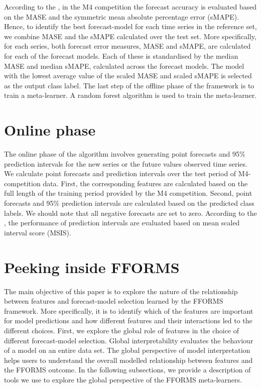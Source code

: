 \documentclass[11pt,a4paper,]{article}
\begin{document}
According to the \textcite{M4compguide}, in the M4 competition the forecast accuracy is evaluated based on the MASE and the symmetric mean absolute percentage error (sMAPE). Hence, to identify the best forecast-model for each time series in the reference set, we combine MASE and the sMAPE calculated over the test set. More specifically, for each series, both forecast error measures, MASE and sMAPE, are calculated for each of the forecast models. Each of these is standardised by the median MASE and median sMAPE, calculated across the forecast models. The model with the lowest average value of the scaled MASE and scaled sMAPE is selected as the output class label. The last step of the offline phase of the framework is to train a meta-learner. A random forest algorithm is used to train the meta-learner.

\hypertarget{online}{%
\section{Online phase}\label{online}}

The online phase of the algorithm involves generating point forecasts and 95\% prediction intervals for the new series or the future values observed time series. We calculate point forecasts and prediction intervals over the test period of M4-competition data. First, the corresponding features are calculated based on the full length of the training period provided by the M4 competition. Second, point forecasts and 95\% prediction intervals are calculated based on the predicted class labels. We should note that all negative forecasts are set to zero. According to the \textcite{M4compguide}, the performance of prediction intervals are evaluated based on mean scaled interval score (MSIS).

\hypertarget{peeking}{%
\section{Peeking inside FFORMS}\label{peeking}}

The main objective of this paper is to explore the nature of the relationship between features and forecast-model selection learned by the FFORMS framework. More specifically, it is to identify which of the features are important for model predictions and how different features and their interactions led to the different choices. First, we explore the global role of features in the choice of different forecast-model selection. Global interpretability evaluates the behaviour of a model on an entire data set. The global perspective of model interpretation helps users to understand the overall modelled relationship between features and the FFORMS outcome. In the following subsections, we provide a description of tools we use to explore the global perspective of the FFORMS meta-learners.
\end{document}

